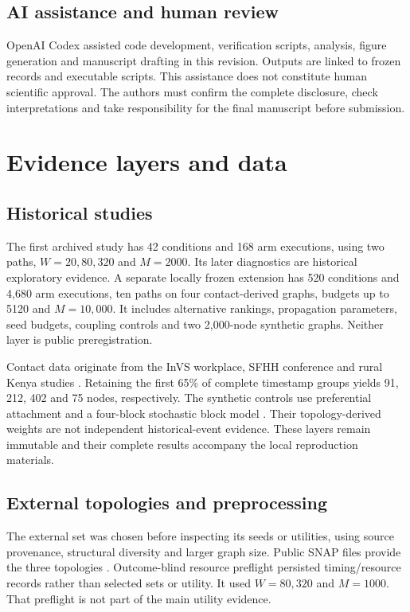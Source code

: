 \documentclass[smallextended]{svjour3}
\begin{document}
\subsection{AI assistance and human review}
OpenAI Codex assisted code development, verification scripts, analysis, figure generation and manuscript drafting in this revision. Outputs are linked to frozen records and executable scripts. This assistance does not constitute human scientific approval. The authors must confirm the complete disclosure, check interpretations and take responsibility for the final manuscript before submission.

\section{Evidence layers and data}
\subsection{Historical studies}
The first archived study has 42 conditions and 168 arm executions, using two paths, $W=20,80,320$ and $M=2000$. Its later diagnostics are historical exploratory evidence. A separate locally frozen extension has 520 conditions and 4,680 arm executions, ten paths on four contact-derived graphs, budgets up to 5120 and $M=10,000$. It includes alternative rankings, propagation parameters, seed budgets, coupling controls and two 2,000-node synthetic graphs. Neither layer is public preregistration.

Contact data originate from the InVS workplace, SFHH conference and rural Kenya studies \cite{ref3,ref4,ref5,ref6}. Retaining the first 65\% of complete timestamp groups yields 91, 212, 402 and 75 nodes, respectively. The synthetic controls use preferential attachment and a four-block stochastic block model \cite{ref17,ref18}. Their topology-derived weights are not independent historical-event evidence. These layers remain immutable and their complete results accompany the local reproduction materials.

\subsection{External topologies and preprocessing}
The external set was chosen before inspecting its seeds or utilities, using source provenance, structural diversity and larger graph size. Public SNAP files provide the three topologies \cite{snap}. Outcome-blind resource preflight persisted timing/resource records rather than selected sets or utility. It used $W=80,320$ and $M=1000$. That preflight is not part of the main utility evidence.
\end{document}
